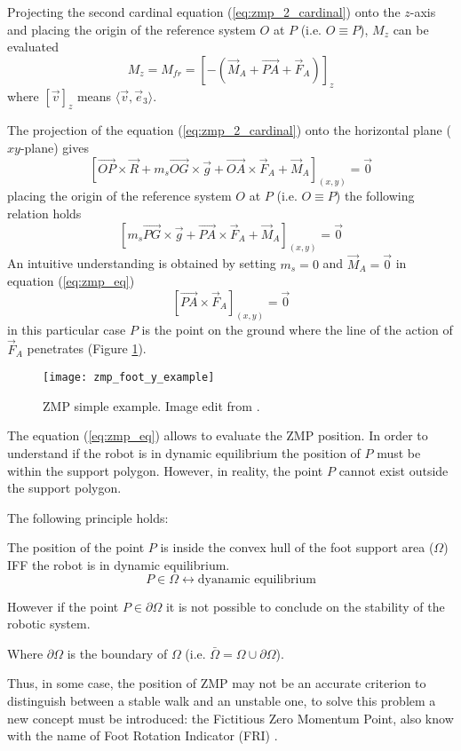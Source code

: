 Projecting the second cardinal equation (\ref{eq:zmp_2_cardinal}) onto the $z$-axis and placing the
origin of the reference system $O$ at $P$ (i.e. $O \equiv P$), $M_z$ can be evaluated
\[
M_z = M_{fr} = [-(\vec{M}_A + \vec{PA} + \vec{F}_A)]_z
\]
where $[\vec{v}]_z$ means $\langle \vec{v},\vec{e}_3 \rangle$.
\par
The projection of the equation (\ref{eq:zmp_2_cardinal}) onto the horizontal plane ($xy$-plane) gives
\[
\left[\vec{OP} \times \vec{R} + m_s \vec{OG} \times \vec{g} + \vec{OA} \times \vec{F}_A + \vec{M}_A\right]_{(x,y)} = \vec{0}
\]
placing the origin of the reference system $O$ at $P$ (i.e. $O \equiv P$) the following relation holds
\begin{equation}
  \label{eq:zmp_eq}
  \left[ m_s \vec{PG} \times \vec{g} + \vec{PA} \times \vec{F}_A + \vec{M}_A\right]_{(x,y)} = \vec{0}
\end{equation}
An intuitive understanding is obtained by setting $m_s = 0$ and $\vec{M}_A = \vec{0}$ in equation
(\ref{eq:zmp_eq})
\[
\left[\vec{PA} \times \vec{F}_A\right]_{(x,y)} = \vec{0}
\]
in this particular case $P$ is the point on the ground where the line of the action of $\vec{F}_A$
penetrates (Figure \ref{fig:zmp_foot_y_example}).
\begin{figure}[!ht]
  \centering
  \texttt{[image: zmp\_foot\_y\_example]}
  \caption{ZMP simple example. Image edit from \cite{Vukobratov2004}. \label{fig:zmp_foot_y_example}}
\end{figure}
The equation (\ref{eq:zmp_eq}) allows to evaluate the ZMP position. In order to understand if the robot
is in dynamic equilibrium the position of $P$ must be within the support polygon. However, in reality, the
point $P$ cannot exist outside the support polygon.
\par
The following principle holds:
\begin{principle}
  \label{principle:zmp}
  The position of the point $P$ is inside the convex hull of the foot support area ($\Omega$)
  IFF the robot is in dynamic equilibrium.
  \[
  P \in \Omega \longleftrightarrow \text{dyanamic equilibrium}
  \]
  \par
  However if the point $P \in \partial \Omega$ it is not possible to conclude on the stability of the robotic system.
  \par
  Where $\partial \Omega$ is the boundary of $\Omega$ (i.e. $\bar{\Omega} = \Omega \cup \partial \Omega$).
\end{principle}
Thus, in some case, the position of ZMP may not be an accurate criterion to distinguish between a
stable walk and an unstable one, to solve this problem a new concept must be introduced: the
Fictitious Zero Momentum Point, also know with the name of Foot Rotation Indicator (FRI)
\cite{Goswami1999}.

